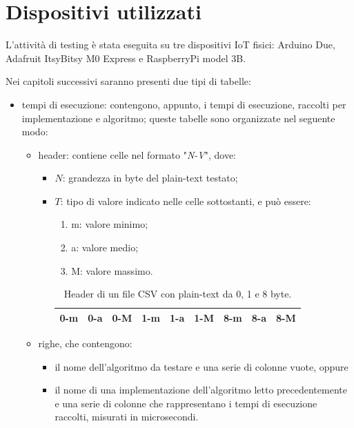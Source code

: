\documentclass[12pt,a4paper,italian]{report}
\begin{document}
\section{Dispositivi utilizzati}

L'attività di testing è stata eseguita su tre dispositivi IoT fisici: Arduino Due, Adafruit ItsyBitsy M0 Express e RaspberryPi model 3B.

\noindent Nei capitoli successivi saranno presenti due tipi di tabelle:
\begin{itemize}
    \item tempi di esecuzione: contengono, appunto, i tempi di esecuzione, raccolti per implementazione e algoritmo; queste tabelle sono organizzate nel seguente modo:
    \begin{itemize}
        \item header: contiene celle nel formato "\textit{N-V}", dove:
        \begin{itemize}
            \item $N$: grandezza in byte del plain-text testato;
            \item $T$: tipo di valore indicato nelle celle sottostanti, e può essere:
            \begin{enumerate}[label=(\arabic*)]
                \item m: valore minimo;
                \item a: valore medio;
                \item M: valore massimo.
            \end{enumerate}
            \begin{table}[H]
                \centering
            	\begin{tabular}{|c|c|c|c|c|c|c|c|c|}
            		\hline
            		0-m & 0-a & 0-M & 1-m & 1-a & 1-M & 8-m & 8-a & 8-M \\
            		\hline
                \end{tabular}
                \caption{Header di un file CSV con plain-text da 0, 1 e 8 byte.}
            \end{table}
        \end{itemize}
        \item righe, che contengono:
            \begin{itemize}
                \item il nome dell'algoritmo da testare e una serie di colonne vuote, oppure
                \item il nome di una implementazione dell'algoritmo letto precedentemente e una serie di colonne che rappresentano i tempi di esecuzione raccolti, misurati in microsecondi.

\end{itemize}
\end{itemize}
\end{itemize}
\end{document}
